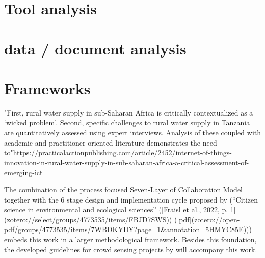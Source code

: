 
\section{Tool analysis}


\section{data / document analysis}


\section{Frameworks}

"First, rural water supply in sub-Saharan Africa is critically contextualized as a ‘wicked problem’. Second, specific challenges to rural water supply in Tanzania are quantitatively assessed using expert interviews. Analysis of these coupled with academic and practitioner-oriented literature demonstrates the need to"https://practicalactionpublishing.com/article/2452/internet-of-things-innovation-in-rural-water-supply-in-sub-saharan-africa-a-critical-assessment-of-emerging-ict

The combination of the  process focused Seven-Layer of Collaboration Model together with the 6 stage design and implementation cycle proposed by \autocite[postnote]{fraislCitizenScienceEnvironmental2022} (“Citizen science in environmental and ecological sciences” ([Fraisl et al., 2022, p. 1](zotero://select/groups/4773535/items/FBJD7SWS)) ([pdf](zotero://open-pdf/groups/4773535/items/7WBDKYDY?page=1&annotation=5HMYC85E))) embeds this work in a larger methodological framework. Besides this foundation, the developed guidelines for crowd sensing projects by \autocite[postnote]{minkman} \Autocite*[test]{minkmanCitizenScienceWater2015} will accompany this work.


